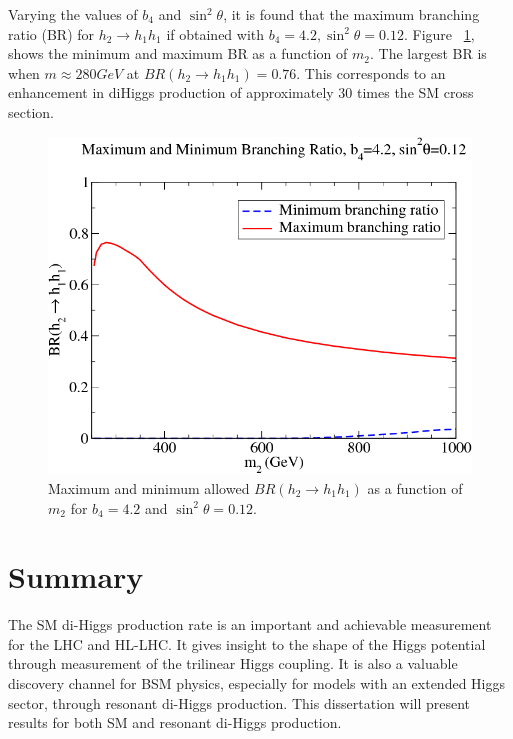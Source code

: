 \indent Varying the values of ${b_{4}}$ and ${\sin^{2}{\theta}}$, it is found that the maximum branching ratio (BR) for ${h_{2}\rightarrow h_{1}h_{1}}$ if obtained with ${b_{4} = 4.2, \sin^{2}\theta = 0.12}$. Figure ~\ref{fig:Ian6}, shows the minimum and maximum BR as a function of ${m_{2}}$. The largest BR is when ${m \approx 280 GeV}$ at ${BR(h_{2}\rightarrow h_{1}h_{1}) = 0.76}$. This corresponds to an enhancement in diHiggs production of approximately 30 times the SM cross section.

\begin{figure}[h]
\begin{center}
\includegraphics[scale=0.5]{figures/Ian6}
\caption{Maximum and minimum allowed ${BR(h_{2}\rightarrow h_{1}h_{1})}$ as a function of ${m_{2}}$ for ${b_{4} = 4.2}$ and ${\sin^{2}{\theta} = 0.12}$.}
\label{fig:Ian6}
\end{center}
\end{figure}

\section{Summary}
The SM di-Higgs production rate is an important and achievable measurement for the LHC and HL-LHC. It gives insight to the shape of the Higgs potential through measurement of the trilinear Higgs coupling. It is also a valuable discovery channel for BSM physics, especially for models with an extended Higgs sector, through resonant di-Higgs production. This dissertation will present results for both SM and resonant di-Higgs production.